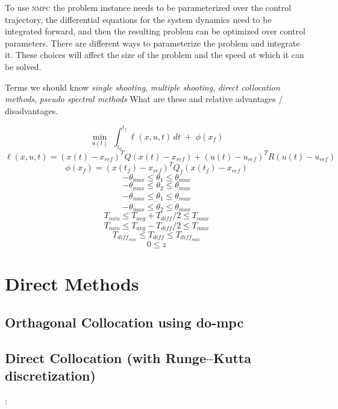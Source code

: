 \documentclass[]{article}
\newcommand{\nmpc}{\textsc{nmpc}}
\begin{document}
To use {\nmpc} the problem instance needs to be parameterized over the control trajectory, the differential equations for the system dynamics need to be integrated forward, and then the resulting problem can be optimized over control parameters. There are different ways to parameterize the problem and integrate it.  These choices will affect the size of the problem and the speed at which it can be solved.

Terms we should know {\em single shooting}, {\em multiple shooting}, {\em direct collocation methods}, {\em pseudo spectral methods} What are these and relative advantages / disadvantages.


        \[
        \min_{u(t)} \; \int_{t_0}^{t_f} \ell(x,u,t)\,dt \;+\; \phi(x_f)
        \]
        \[
	\ell(x,u,t) = (x(t)-x_{ref})^T Q (x(t)-x_{ref}) + (u(t)-u_{ref})^T R (u(t)-u_{ref}) 
        \]
        \[
	\phi(x_f) = (x(t_f)-x_{ref})^T Q_f (x(t_f)-x_{ref})
        \]
        \[
	-\theta_{max} \leq \theta_1 \leq \theta_{max}
        \]
        \[
	-\theta_{max} \leq \theta_2 \leq \theta_{max}
        \]
        \[
        	-\dot{\theta}_{max} \leq \dot{\theta}_1 \leq \dot{\theta}_{max}
        \]
        \[
        	-\dot{\theta}_{max} \leq \dot{\theta}_2 \leq \dot{\theta}_{max}
        \]
        \[
        	T_{min}  \leq T_{avg} + T_{diff}/2 \leq T_{max}
        \]
        \[
        T_{min} \leq  T_{avg} - T_{diff}/2 \leq T_{max}
        \]
        \[
        T_{diff_{min}} \leq T_{diff} \leq T_{diff_{max}}
        \]
        \[
        0 \leq z
        \]
        
\section{Direct Methods}
\subsection*{Orthagonal Collocation using {do-mpc}} 
\subsection*{Direct Collocation (with Runge–Kutta discretization)}: 
\end{document}
